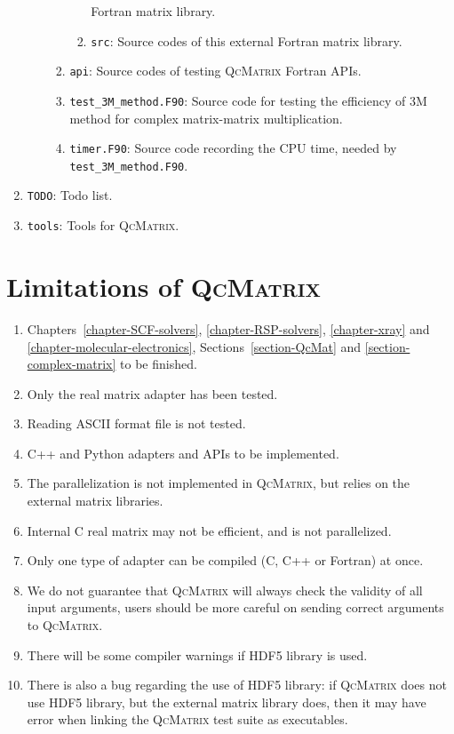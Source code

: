 \documentclass[a4paper,11pt,twoside,openright]{book}
\begin{document}
\begin{enumerate}
\begin{enumerate}
\begin{enumerate}
\begin{enumerate}
                Fortran matrix library.
              \item {\color{blue}\verb|src|}: Source codes of this external Fortran %
                matrix library.
            \end{enumerate}
          \item {\color{blue}\verb|api|}: Source codes of testing \textsc{QcMatrix} %
            Fortran APIs.
          \item \verb|test_3M_method.F90|: Source code for testing the efficiency of %
            3M method for complex matrix-matrix multiplication.
          \item \verb|timer.F90|: Source code recording the CPU time, needed by %
            \verb|test_3M_method.F90|.
        \end{enumerate}
    \end{enumerate}
  \item \verb|TODO|: Todo list.
  \item {\color{blue}\verb|tools|}: Tools for \textsc{QcMatrix}.
\end{enumerate}

\chapter{Limitations of \textsc{QcMatrix}}
\label{chapter-limitations}

\begin{enumerate}
  \item Chapters~\ref{chapter-SCF-solvers}, \ref{chapter-RSP-solvers}, \ref{chapter-xray}
    and \ref{chapter-molecular-electronics}, Sections~\ref{section-QcMat} and \ref{section-complex-matrix}
    to be finished.
  \item Only the real matrix adapter has been tested.
  \item Reading ASCII format file is not tested.
  \item C++ and Python adapters and APIs to be implemented.
  \item The parallelization is not implemented in \textsc{QcMatrix}, but relies
    on the external matrix libraries.
  \item Internal C real matrix may not be efficient, and is not parallelized.
  \item Only one type of adapter can be compiled (C, C++ or Fortran) at once.
  \item We do not guarantee that \textsc{QcMatrix} will always check the validity
    of all input arguments, users should be more careful on sending correct
    arguments to \textsc{QcMatrix}.
  \item There will be some compiler warnings if HDF5 library is used.
  \item There is also a bug regarding the use of HDF5 library: if \textsc{QcMatrix}
    does not use HDF5 library, but the external matrix library does, then it
    may have error when linking the \textsc{QcMatrix} test suite as executables.
\end{enumerate}
\end{document}
